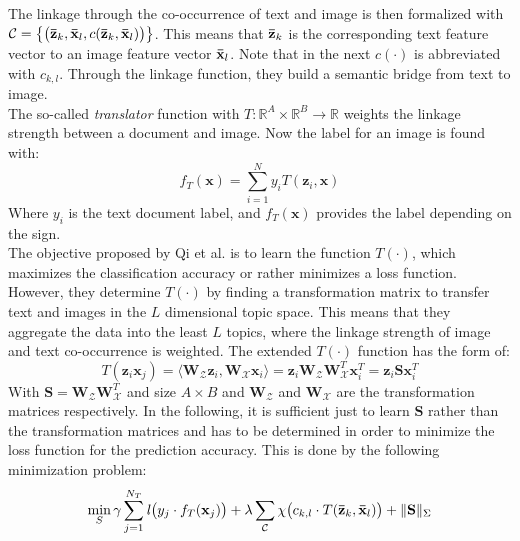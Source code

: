 The linkage through the co-occurrence of text and image is then formalized with $\mathcal{C} = \big\{\big( \mathbf{\bar{z}}_k,\mathbf{\bar{x}}_l,c( \mathbf{\bar{z}}_k,\mathbf{\bar{x}}_l) \big)\big\}$.
This means that $\mathbf{\bar{z}}_k$ is the corresponding text feature vector to an image feature vector $\mathbf{\bar{x}}_l$.
Note that in the next $c(\cdot)$ is abbreviated with $c_{k,l}$.
Through the linkage function, they build a semantic bridge from text to image.\cite{Qi.2011}\\
The so-called \textit{translator} function with $T : \mathbb{R}^A \times \mathbb{R}^B \to \mathbb{R}$ weights the linkage strength between a document and image.
Now the label for an image is found with:\cite{Qi.2011}
\begin{equation}
	f_T (\mathbf{x}) = \sum_{i=1}^{N} y_i T(\mathbf{z}_i,\mathbf{x})
\end{equation}
Where $y_i$ is the text document label, and $f_T (\mathbf{x})$ provides the label depending on the sign.\\
The objective proposed by Qi et al. is to learn the function $T(\cdot)$, which maximizes the classification accuracy or rather minimizes a loss function. However, they determine $T(\cdot)$ by finding a transformation matrix to transfer text and images in the $L$ dimensional topic space. This means that they aggregate the data into the least $L$ topics, where the linkage strength of image and text co-occurrence is weighted. The extended $T(\cdot)$ function has the form of:\cite{Qi.2011}
\begin{equation}
T(\mathbf{z}_i\mathbf{x}_j) = \langle \mathbf{W}_\mathcal{Z}\mathbf{z}_i,\mathbf{W}_\mathcal{X}\mathbf{x}_i\rangle = \mathbf{z}_i \mathbf{W}_\mathcal{Z}\mathbf{W}_\mathcal{X}^T\mathbf{x}_i^T = \mathbf{z}_i\mathbf{S}\mathbf{x}_i^T 
\end{equation}
With $\mathbf{S} = \mathbf{W}_\mathcal{Z}\mathbf{W}_\mathcal{X}^T$ and size $A \times B$ and $\mathbf{W}_\mathcal{Z}$ and $\mathbf{W}_\mathcal{X}$ are the transformation matrices respectively.
In the following, it is sufficient just to learn $\mathbf{S}$ rather than the transformation matrices and has to be determined in order to minimize the loss function for the prediction accuracy. This is done by the following minimization problem:
\begin{equation}\label{EqTTIGeneralOpt}
\min_{S} \gamma \sum_{j=1}^{N_T}\mathit{l}\big( y_j \cdot f_T(\mathbf{x}_j) \big) + \lambda \sum_{\mathcal{C}}  \chi \big( c_{k,l} \cdot T(\mathbf{\bar{z}}_k,\mathbf{\bar{x}}_l)\big) + \Vert \mathbf{S}\Vert_\Sigma
\end{equation}
